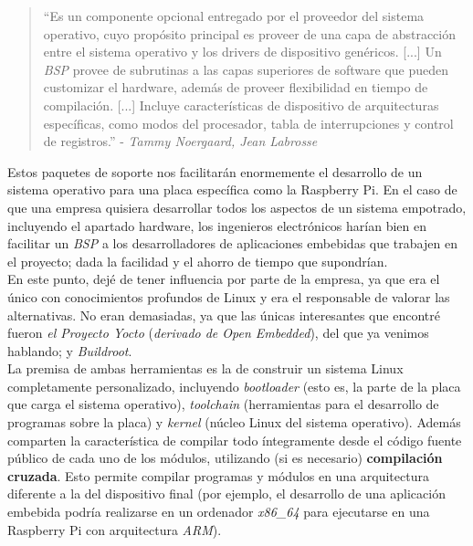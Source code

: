 \begin{quotation}
	``Es un componente opcional entregado por el proveedor del sistema operativo, cuyo propósito principal es proveer de una capa de abstracción entre el sistema operativo y los drivers de dispositivo genéricos. [...] Un \textit{BSP} provee de subrutinas a las capas superiores de software que pueden customizar el hardware, además de proveer flexibilidad en tiempo de compilación. [...] Incluye características de dispositivo de arquitecturas específicas, como modos del procesador, tabla de interrupciones y control de registros.'' - \textit{Tammy Noergaard, Jean Labrosse} \cite{embedded-software-know-it-all-bsp}
\end{quotation}

Estos paquetes de soporte nos facilitarán enormemente el desarrollo de un sistema operativo para una placa específica como la Raspberry Pi. En el caso de que una empresa quisiera desarrollar todos los aspectos de un sistema empotrado, incluyendo el apartado hardware, los ingenieros electrónicos harían bien en facilitar un \textit{BSP} a los desarrolladores de aplicaciones embebidas que trabajen en el proyecto; dada la facilidad y el ahorro de tiempo que supondrían.\\

En este punto, dejé de tener influencia por parte de la empresa, ya que era el único con conocimientos profundos de Linux y era el responsable de valorar las alternativas. No eran demasiadas, ya que las únicas interesantes que encontré fueron \textit{el Proyecto Yocto} (\textit{derivado de Open Embedded}), del que ya venimos hablando; y \textit{Buildroot}.\\

La premisa de ambas herramientas es la de construir un sistema Linux completamente personalizado, incluyendo \textit{bootloader} (esto es, la parte de la placa que carga el sistema operativo), \textit{toolchain} (herramientas para el desarrollo de programas sobre la placa) y \textit{kernel} (núcleo Linux del sistema operativo). Además comparten la característica de compilar todo íntegramente desde el código fuente público de cada uno de los módulos, utilizando (si es necesario) \textbf{compilación cruzada}. Esto permite compilar programas y módulos en una arquitectura diferente a la del dispositivo final (por ejemplo, el desarrollo de una aplicación embebida podría realizarse en un ordenador \textit{x86\_64} para ejecutarse en una Raspberry Pi con arquitectura \textit{ARM}).\\

